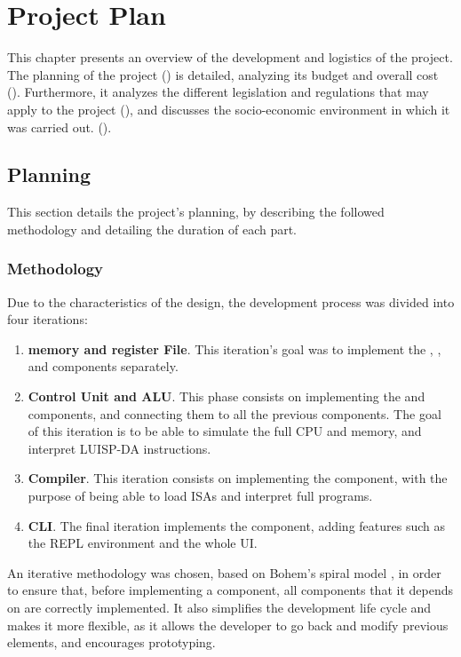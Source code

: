 \chapter{Project Plan}\label{chap:planning}
This chapter presents an overview of the development and logistics of the project. The planning of the project () is detailed, analyzing its budget and overall cost (). Furthermore, it analyzes the different legislation and regulations that may apply to the project (), and discusses the socio-economic environment in which it was carried out. ().


\section{Planning}\label{sec:planning}
This section details the project's planning, by describing the followed methodology and detailing the duration of each part.

\subsection{Methodology}
Due to the characteristics of the design, the development process was divided into four iterations:
\begin{enumerate}[label=\Roman*.]
  \item \textbf{\Gls{memory} and \Gls{register} File}. This iteration's goal was to implement the , , and  components separately.
  \item \textbf{Control Unit and \gls{ALU}}. This phase consists on implementing the  and  components, and connecting them to all the previous components. The goal of this iteration is to be able to simulate the full \gls{CPU} and \gls{memory}, and interpret LUISP-DA instructions.
  \item \textbf{Compiler}. This iteration consists on implementing the  component, with the purpose of being able to load \glspl{ISA} and interpret full programs.
  \item \textbf{\gls{CLI}}. The final iteration implements the  component, adding features such as the \gls{REPL environment} and the whole \gls{UI}.
\end{enumerate}

An iterative methodology was chosen, based on Bohem's spiral model \parencite{BohemBSpiral}, in order to ensure that, before implementing a component, all components that it depends on are correctly implemented. It also simplifies the development life cycle and makes it more flexible, as it allows the developer to go back and modify previous elements, and encourages prototyping.

